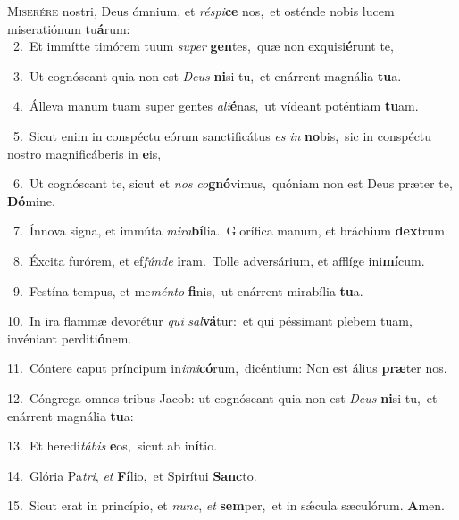 \lettrine{\initial\textcolor{\initialcolor}{M}}{iserére} nostri, Deus ómnium, et \textit{ré}\-\textit{spi}\textbf{ce} nos,~\star et osténde nobis lucem miseratiónum tu\-\textbf{á}\-rum:\\
{\numbfont\textcolor{\numbcolor}{~2.}}~Et immítte timórem tuum \textit{su}\-\textit{per} \textbf{gen}\-tes,~\star quæ non exquisi\-\textbf{é}\-runt te,\par
{\numbfont\textcolor{\numbcolor}{~3.}}~Ut cognóscant quia non est \textit{De}\-\textit{us} \textbf{ni}\-si tu,~\star et enárrent magnália \textbf{tu}\-a.\par
{\numbfont\textcolor{\numbcolor}{~4.}}~Álleva manum tuam super gentes \textit{a}\-\textit{li}\textbf{é}nas,~\star ut vídeant poténtiam \textbf{tu}\-am.\par
{\numbfont\textcolor{\numbcolor}{~5.}}~Sicut enim in conspéctu eórum sanctificátus \textit{es} \textit{in} \textbf{no}\-bis,~\star sic in conspéctu nostro magnificáberis in \textbf{e}\-is,\par
{\numbfont\textcolor{\numbcolor}{~6.}}~Ut cognóscant te, sicut et \textit{nos} \textit{co}\-\textbf{gnó}vimus,~\star quóniam non est Deus præter te, \textbf{Dó}\-mine.\par
{\numbfont\textcolor{\numbcolor}{~7.}}~Ínnova signa, et immúta \textit{mi}\-\textit{ra}\textbf{bí}lia.~\star Glorífica manum, et bráchium \textbf{dex}\-trum.\par
{\numbfont\textcolor{\numbcolor}{~8.}}~Éxcita furórem, et ef\-\textit{fún}\-\textit{de} \textbf{i}\-ram.~\star Tolle adversárium, et afflíge ini\-\textbf{mí}\-cum.\par
{\numbfont\textcolor{\numbcolor}{~9.}}~Festína tempus, et me\-\textit{mén}\-\textit{to} \textbf{fi}\-nis,~\star ut enárrent mirabília \textbf{tu}\-a.\par
{\numbfont\textcolor{\numbcolor}{10.}}~In ira flammæ devorétur \textit{qui} \textit{sal}\-\textbf{vá}tur:~\star et qui péssimant plebem tuam, invéniant perditi\-\textbf{ó}\-nem.\par
{\numbfont\textcolor{\numbcolor}{11.}}~Cóntere caput príncipum in\-\textit{i}\-\textit{mi}\textbf{có}rum,~\star dicéntium: Non est álius \textbf{præ}\-ter nos.\par
{\numbfont\textcolor{\numbcolor}{12.}}~Cóngrega omnes tribus Jacob: ut cognóscant quia non est \textit{De}\-\textit{us} \textbf{ni}\-si tu,~\star et enárrent magnália \textbf{tu}\-a:\par
{\numbfont\textcolor{\numbcolor}{13.}}~Et heredi\-\textit{tá}\-\textit{bis} \textbf{e}\-os,~\star sicut ab in\-\textbf{í}\-tio.\par
{\numbfont\textcolor{\numbcolor}{14.}}~Glória Pa\-\textit{tri}\-, \textit{et} \textbf{Fí}\-lio,~\star et Spirítui \textbf{Sanc}\-to.\par
{\numbfont\textcolor{\numbcolor}{15.}}~Sicut erat in princípio, et \textit{nunc}\-, \textit{et} \textbf{sem}\-per,~\star et in sǽcula sæculórum. \textbf{A}\-men.\par
